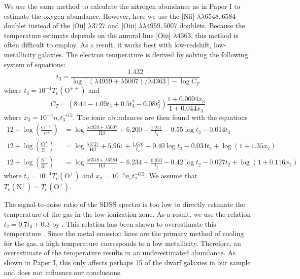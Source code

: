 We use the same method to calculate the nitrogen abundance as in Paper I to 
estimate the oxygen abundance.  However, here we use the [N{\sc ii}] 
$\lambda \lambda 6548, 6584$ doublet instead of the [O{\sc ii}] $\lambda 3727$ 
and [O{\sc iii}] $\lambda \lambda 4959,5007$ doublets.  Because the temperature 
estimate depends on the auroral line [O{\sc iii}] $\lambda 4363$, this method is 
often difficult to employ.  As a result, it works best with low-redshift, 
low-metallicity galaxies.  The electron temperature is derived by solving the 
following system of equations:
\begin{equation}
	t_3 = \frac{1.432}{\log[(\lambda 4959 + \lambda 5007)/\lambda 4363] - \log C_T}
\end{equation}
where $t_3 = 10^{-4} T_e(\text{O}^{++})$ and
\begin{equation}
	C_T = (8.44 - 1.09t_3 + 0.5t_3^2 - 0.08t_3^3)\frac{1 + 0.0004x_3}{1 + 0.044x_3}
\end{equation}
where $x_3 = 10^{-4} n_e t_3^{-0.5}$.  The ionic abundances are then found with 
the equations
\begin{align}
    12 + \log \left( \frac{\text{O}^{++}}{\text{H}^+} \right) &= \log \frac{\lambda 4959 + \lambda 5007}{\text{H}\beta} + 6.200 + \frac{1.251}{t_3} - 0.55\log t_3 - 0.014t_3 \\
	12 + \log \left( \frac{\text{O}^+}{\text{H}^+} \right) &= \log \frac{\lambda 3727}{\text{H}\beta} + 5.961 + \frac{1.676}{t_2} - 0.40\log t_2 - 0.034t_2 + \log (1+1.35x_2) \\
	12 + \log \left( \frac{\text{N}^+}{\text{H}^+} \right) &= \log \frac{\lambda 6548 + \lambda 6584}{\text{H}\beta} + 6.234 + \frac{0.950}{t_2} - 0.42\log t_2 - 0.027t_2 + \log (1 + 0.116x_2)
\end{align}
where $t_2 = 10^{-4} T_e(\text{O}^+)$ and $x_2 = 10^{-4} n_e t_2^{-0.5}$.  We 
assume that $T_e(\text{N}^+) = T_e(\text{O}^+)$.

The signal-to-noise ratio of the SDSS spectra is too low to directly estimate 
the temperature of the gas in the low-ionization zone.  As a result, we use the 
relation $t_2 = 0.7t_3 + 0.3$ by \cite{Garnett92}.  This relation has been shown 
to overestimate this temperature \citep{Andrews13}.  Since the metal emission 
lines are the primary method of cooling for the gas, a high temperature 
corresponds to a low metallicity.  Therefore, an overestimate of the temperature 
results in an underestimated abundance.  As shown in Paper I, this only affects 
perhaps 15 of the dwarf galaxies in our sample and does not influence our 
conclusions.

